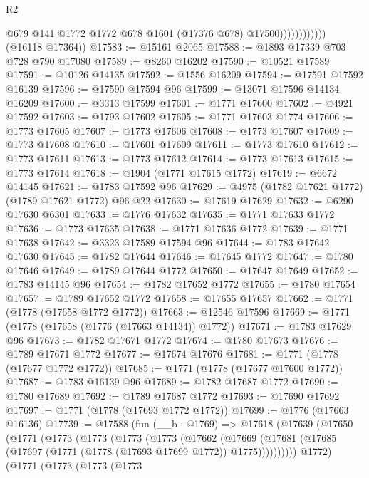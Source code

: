 \begin{lexlean}{R2}
\begin{coremodule}
                              @679
                              @141
                              @1772
                              @1772
                              @678
                              @1601
                              (@17376 @678)
                              @17500))))))))))))
      (@16118 @17364))
@17583 := @15161 @2065
@17588 := @1893 @17339 @703 @728 @790 @17080
@17589 := @8260 @16202
@17590 := @10521 @17589
@17591 := @10126 @14135
@17592 := @1556 @16209
@17594 := @17591 @17592 @16139
@17596 := @17590 @17594 @96
@17599 := @13071 @17596 @14134 @16209
@17600 := @3313 @17599
@17601 := @1771 @17600
@17602 := @4921 @17592
@17603 := @1793 @17602
@17605 := @1771 @17603 @1774
@17606 := @1773 @17605
@17607 := @1773 @17606
@17608 := @1773 @17607
@17609 := @1773 @17608
@17610 := @17601 @17609
@17611 := @1773 @17610
@17612 := @1773 @17611
@17613 := @1773 @17612
@17614 := @1773 @17613
@17615 := @1773 @17614
@17618 := @1904 (@1771 @17615 @1772)
@17619 := @6672 @14145
@17621 := @1783 @17592 @96
@17629 := @4975 (@1782 @17621 @1772) (@1789 @17621 @1772) @96 @22
@17630 := @17619 @17629
@17632 := @6290 @17630 @6301
@17633 := @1776 @17632
@17635 := @1771 @17633 @1772
@17636 := @1773 @17635
@17638 := @1771 @17636 @1772
@17639 := @1771 @17638
@17642 := @3323 @17589 @17594 @96
@17644 := @1783 @17642 @17630
@17645 := @1782 @17644
@17646 := @17645 @1772
@17647 := @1780 @17646
@17649 := @1789 @17644 @1772
@17650 := @17647 @17649
@17652 := @1783 @14145 @96
@17654 := @1782 @17652 @1772
@17655 := @1780 @17654
@17657 := @1789 @17652 @1772
@17658 := @17655 @17657
@17662 := @1771 (@1778 (@17658 @1772 @1772))
@17663 := @12546 @17596
@17669 := @1771 (@1778 (@17658 (@1776 (@17663 @14134)) @1772))
@17671 := @1783 @17629 @96
@17673 := @1782 @17671 @1772
@17674 := @1780 @17673
@17676 := @1789 @17671 @1772
@17677 := @17674 @17676
@17681 := @1771 (@1778 (@17677 @1772 @1772))
@17685 := @1771 (@1778 (@17677 @17600 @1772))
@17687 := @1783 @16139 @96
@17689 := @1782 @17687 @1772
@17690 := @1780 @17689
@17692 := @1789 @17687 @1772
@17693 := @17690 @17692
@17697 := @1771 (@1778 (@17693 @1772 @1772))
@17699 := @1776 (@17663 @16136)
@17739 := @17588
    (fun (__b : @1769) =>
    @17618
      (@17639
        (@17650
          (@1771
            (@1773
              (@1773
                (@1773
                  (@1773
                    (@17662
                      (@17669
                        (@17681 (@17685 (@17697 (@1771 (@1778 (@17693 @17699 @1772)) @1775))))))))))
            @1772)
          (@1771
            (@1773
              (@1773
                (@1773

\end{coremodule}
\end{lexlean}
